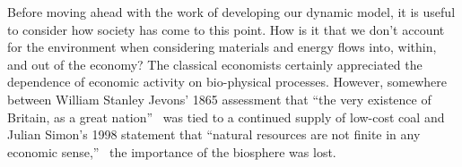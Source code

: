 Before moving ahead with the work of developing our dynamic model,
it is useful to consider how society has come to this point.
How is it that we don't account for the environment when 
considering materials and energy flows into, within, and out of the economy?
The classical economists certainly appreciated the dependence of
economic activity on bio-physical processes.\cite{Cleveland1987, Hall2011, Dale2012}
However, somewhere between William Stanley Jevons' 1865
assessment that
``the very existence of Britain, as a great nation''~\cite[IV.3]{Jevons1865}
was tied to a continued supply of low-cost coal%
and Julian Simon's 1998 statement that
``natural resources are not finite in any economic sense,''~\cite[p.~54]{Simon1998} %
the importance of the biosphere was lost.

%



